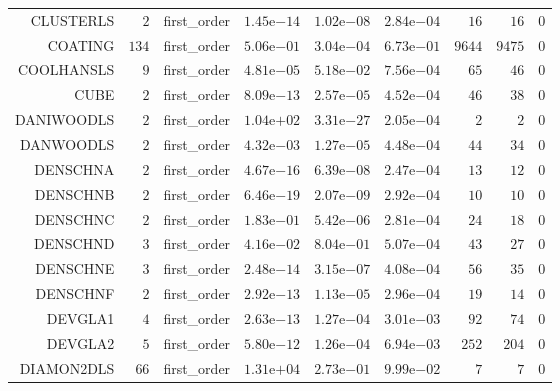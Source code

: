 \begin{longtable}{rrrrrrrrr}
CLUSTERLS & \(     2\) & first\_order & \( 1.45\)e\(-14\) & \( 1.02\)e\(-08\) & \( 2.84\)e\(-04\) & \(    16\) & \(    16\) & \(     0\) \\
COATING & \(   134\) & first\_order & \( 5.06\)e\(-01\) & \( 3.04\)e\(-04\) & \( 6.73\)e\(-01\) & \(  9644\) & \(  9475\) & \(     0\) \\
COOLHANSLS & \(     9\) & first\_order & \( 4.81\)e\(-05\) & \( 5.18\)e\(-02\) & \( 7.56\)e\(-04\) & \(    65\) & \(    46\) & \(     0\) \\
CUBE & \(     2\) & first\_order & \( 8.09\)e\(-13\) & \( 2.57\)e\(-05\) & \( 4.52\)e\(-04\) & \(    46\) & \(    38\) & \(     0\) \\
DANIWOODLS & \(     2\) & first\_order & \( 1.04\)e\(+02\) & \( 3.31\)e\(-27\) & \( 2.05\)e\(-04\) & \(     2\) & \(     2\) & \(     0\) \\
DANWOODLS & \(     2\) & first\_order & \( 4.32\)e\(-03\) & \( 1.27\)e\(-05\) & \( 4.48\)e\(-04\) & \(    44\) & \(    34\) & \(     0\) \\
DENSCHNA & \(     2\) & first\_order & \( 4.67\)e\(-16\) & \( 6.39\)e\(-08\) & \( 2.47\)e\(-04\) & \(    13\) & \(    12\) & \(     0\) \\
DENSCHNB & \(     2\) & first\_order & \( 6.46\)e\(-19\) & \( 2.07\)e\(-09\) & \( 2.92\)e\(-04\) & \(    10\) & \(    10\) & \(     0\) \\
DENSCHNC & \(     2\) & first\_order & \( 1.83\)e\(-01\) & \( 5.42\)e\(-06\) & \( 2.81\)e\(-04\) & \(    24\) & \(    18\) & \(     0\) \\
DENSCHND & \(     3\) & first\_order & \( 4.16\)e\(-02\) & \( 8.04\)e\(-01\) & \( 5.07\)e\(-04\) & \(    43\) & \(    27\) & \(     0\) \\
DENSCHNE & \(     3\) & first\_order & \( 2.48\)e\(-14\) & \( 3.15\)e\(-07\) & \( 4.08\)e\(-04\) & \(    56\) & \(    35\) & \(     0\) \\
DENSCHNF & \(     2\) & first\_order & \( 2.92\)e\(-13\) & \( 1.13\)e\(-05\) & \( 2.96\)e\(-04\) & \(    19\) & \(    14\) & \(     0\) \\
DEVGLA1 & \(     4\) & first\_order & \( 2.63\)e\(-13\) & \( 1.27\)e\(-04\) & \( 3.01\)e\(-03\) & \(    92\) & \(    74\) & \(     0\) \\
DEVGLA2 & \(     5\) & first\_order & \( 5.80\)e\(-12\) & \( 1.26\)e\(-04\) & \( 6.94\)e\(-03\) & \(   252\) & \(   204\) & \(     0\) \\
DIAMON2DLS & \(    66\) & first\_order & \( 1.31\)e\(+04\) & \( 2.73\)e\(-01\) & \( 9.99\)e\(-02\) & \(     7\) & \(     7\) & \(     0\) \\

\end{longtable}

